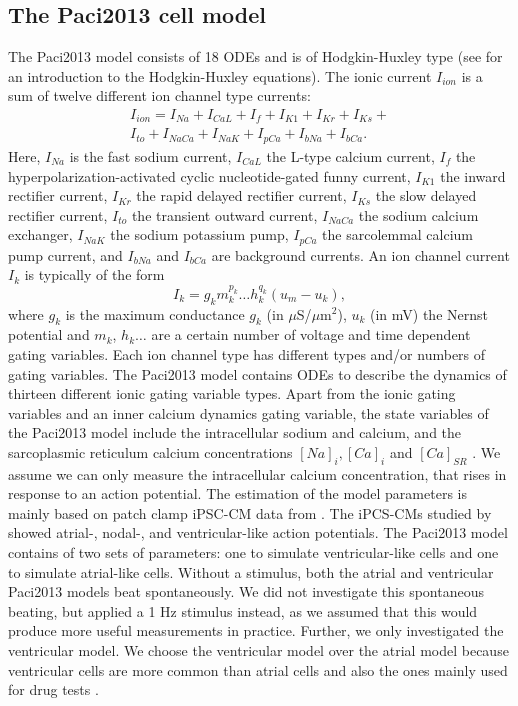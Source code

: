 \documentclass{article}
\begin{document}
\subsection{The Paci2013 cell model} \label{The Paci2013 cell model}
The Paci2013 model consists of 18 ODEs and is of Hodgkin-Huxley type (see \cite[p. 195-215]{KeenerI} for an introduction to the Hodgkin-Huxley equations). The ionic current $I_{ion}$ is a sum of twelve different ion channel type currents:
\begin{eqnarray}
I_{ion}=I_{Na}+I_{CaL}+I_f+I_{K1}+I_{Kr}+I_{Ks}+ \\
I_{to}+I_{NaCa}+I_{NaK}+I_{pCa}+I_{bNa}+I_{bCa}.
\end{eqnarray}
Here, $I_{Na}$ is the fast sodium current, $I_{CaL}$ the L-type calcium current, $I_f$ the hyperpolarization-activated cyclic nucleotide-gated funny current, $I_{K1}$ the inward rectifier current, $I_{Kr}$ the rapid delayed rectifier current, $I_{Ks}$ the slow delayed rectifier current, $I_{to}$ the transient outward current, $I_{NaCa}$ the sodium calcium exchanger, $I_{NaK}$ the sodium potassium pump, $I_{pCa}$ the sarcolemmal calcium pump current, and $I_{bNa}$ and $I_{bCa}$ are background currents.
An ion channel current $I_k$ is typically of the form 
\begin{equation}
I_{k}=g_k m_k^{p_k}\ldots h_k^{q_k}(u_m-u_k),
\end{equation}
where $g_k$ is the maximum conductance $g_k$ (in $\mu$S/$\mu$m$^2$), $u_k$ (in mV) the Nernst potential and $m_k$, $h_k \ldots$ are a certain number of voltage and time dependent gating variables. Each ion channel type has different types and/or numbers of gating variables. The Paci2013 model contains ODEs to describe the dynamics of thirteen different ionic gating variable types. Apart from the ionic gating variables and an inner calcium dynamics gating variable, the state variables of the Paci2013 model include the intracellular sodium and calcium, and the sarcoplasmic reticulum calcium concentrations $[Na]_i, [Ca]_i$ and $[Ca]_{SR}$ \cite{Paci2013}. We assume we can only measure the intracellular calcium concentration, that rises in response to an action potential. The estimation of the model parameters is mainly based on patch clamp iPSC-CM data from \cite{Ma2011}. The iPCS-CMs studied by \cite{Ma2011} showed atrial-, nodal-, and ventricular-like action potentials. The Paci2013 model contains of two sets of parameters: one to simulate ventricular-like cells and one to simulate atrial-like cells. Without a stimulus, both the atrial and ventricular Paci2013 models beat spontaneously. We did not investigate this spontaneous beating, but applied a 1 Hz stimulus instead, as we assumed that this would produce more useful measurements in practice. Further, we only investigated the ventricular model. We choose the ventricular model over the atrial model because ventricular cells are more common than atrial cells and also the ones mainly used for drug tests \cite{Paci2015}.
%
\end{document}
